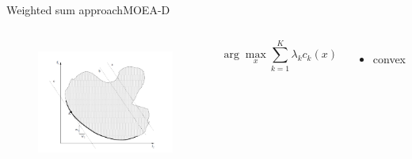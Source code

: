 \begin{frame}{Weighted sum approach}{MOEA-D}
	\begin{columns}
		\begin{figure}
			\centering
			\includegraphics[width=\linewidth]{figure/weighted_sum}
			\label{fig:weighted_sum}
		\end{figure}
		\begin{minipage}{\textwidth}
			\begin{equation}
			\nonumber
			\arg\max_x \sum_{k=1}^{K} \lambda_{k} c_{k} (x)
			\end{equation}
			\begin{itemize}
				\item convex
			\end{itemize}
		\end{minipage}
	\end{columns}
\end{frame}

